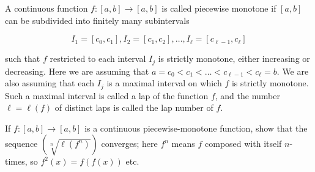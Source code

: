 A continuous function $f : [a, b] \to [a, b]$ is called piecewise monotone if
$[a, b]$ can be subdivided into finitely many subintervals

$$ I_1 = [c_0, c_1], I_2 = [c_1, c_2], \dots, I_\ell = [c_{\ell-1}, c_\ell] $$

such that $f$ restricted to each interval $I_j$ is strictly monotone, either
increasing or decreasing. Here we are assuming that $a = c_0 < c_1 < \dots <
c_{\ell-1} < c_\ell = b$. We are also assuming that each $I_j$ is a maximal
interval on which $f$ is strictly monotone. Such a maximal interval is called a
lap of the function $f$, and the number $\ell = \ell(f)$ of distinct laps is
called the lap number of $f$.

If $f : [a, b] \to [a, b]$ is a continuous piecewise-monotone function, show
that the sequence $\left( \sqrt[n]{\ell(f^n)} \right)$ converges; here $f^n$
means $f$ composed with itself $n$-times, so $f^2(x) = f(f(x))$ etc.
